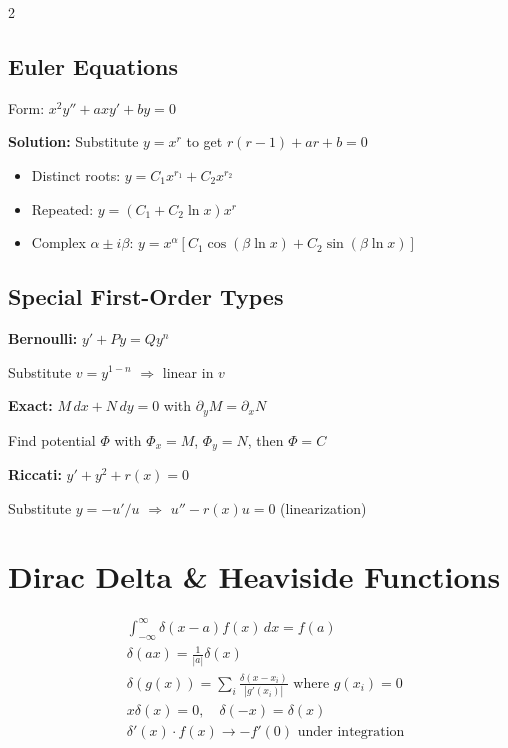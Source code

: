 \documentclass[10pt,a4paper]{article}
\begin{document}
\begin{multicols}{2}
\subsection{Euler Equations}
Form: $x^2 y'' + ax y' + by = 0$

\textbf{Solution:} Substitute $y = x^r$ to get $r(r-1) + ar + b = 0$
\begin{itemize}
    \item Distinct roots: $y = C_1 x^{r_1} + C_2 x^{r_2}$
    \item Repeated: $y = (C_1 + C_2\ln x)x^r$
    \item Complex $\alpha \pm i\beta$: $y = x^\alpha[C_1\cos(\beta\ln x) + C_2\sin(\beta\ln x)]$
\end{itemize}

\subsection{Special First-Order Types}
\textbf{Bernoulli:} $y' + Py = Qy^n$

Substitute $v = y^{1-n}$ $\Rightarrow$ linear in $v$

\textbf{Exact:} $M\,dx + N\,dy = 0$ with $\partial_y M = \partial_x N$

Find potential $\Phi$ with $\Phi_x = M$, $\Phi_y = N$, then $\Phi = C$

\textbf{Riccati:} $y' + y^2 + r(x) = 0$

Substitute $y = -u'/u$ $\Rightarrow$ $u'' - r(x)u = 0$ (linearization)

\section{Dirac Delta \& Heaviside Functions}

\begin{keyformula}
\begin{align}
&\int_{-\infty}^{\infty} \delta(x-a)f(x)\,dx = f(a) \\
&\delta(ax) = \frac{1}{|a|}\delta(x) \\
&\delta(g(x)) = \sum_i \frac{\delta(x-x_i)}{|g'(x_i)|} \text{ where } g(x_i)=0 \\
&x\delta(x) = 0,\quad \delta(-x) = \delta(x) \\
&\delta'(x) \cdot f(x) \to -f'(0) \text{ under integration}
\end{align}
\end{keyformula}


\end{multicols}
\end{document}
